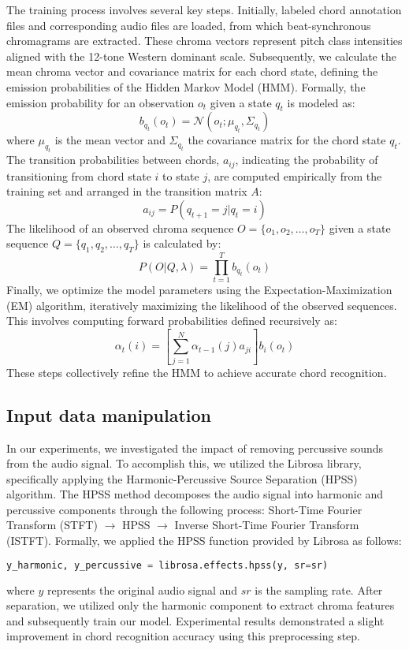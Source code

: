 \documentclass{article}
\begin{document}
The training process involves several key steps. Initially, labeled chord annotation files and corresponding audio files are loaded, from which beat-synchronous chromagrams are extracted. These chroma vectors represent pitch class intensities aligned with the 12-tone Western dominant scale. Subsequently, we calculate the mean chroma vector and covariance matrix for each chord state, defining the emission probabilities of the Hidden Markov Model (HMM). Formally, the emission probability for an observation $o_t$ given a state $q_t$ is modeled as:
\begin{equation}
b_{q_t}(o_t) = \mathcal{N}(o_t;\mu_{q_t}, \Sigma_{q_t})
\end{equation}
where $\mu_{q_t}$ is the mean vector and $\Sigma_{q_t}$ the covariance matrix for the chord state $q_t$. The transition probabilities between chords, $a_{ij}$, indicating the probability of transitioning from chord state $i$ to state $j$, are computed empirically from the training set and arranged in the transition matrix $A$:
\begin{equation}
a_{ij} = P(q_{t+1}=j|q_t=i)
\end{equation}
The likelihood of an observed chroma sequence $O = \{o_1, o_2, \dots, o_T\}$ given a state sequence $Q = \{q_1, q_2, \dots, q_T\}$ is calculated by:
\begin{equation}
P(O|Q,\lambda) = \prod_{t=1}^{T} b_{q_t}(o_t)
\end{equation}
Finally, we optimize the model parameters using the Expectation-Maximization (EM) algorithm, iteratively maximizing the likelihood of the observed sequences. This involves computing forward probabilities defined recursively as:
\begin{equation}
\alpha_t(i) = \left[\sum_{j=1}^{N}\alpha_{t-1}(j)a_{ji}\right] b_i(o_t)
\end{equation}
These steps collectively refine the HMM to achieve accurate chord recognition.

\subsection{Input data manipulation}
In our experiments, we investigated the impact of removing percussive sounds from the audio signal. To accomplish this, we utilized the Librosa library, specifically applying the Harmonic-Percussive Source Separation (HPSS) algorithm. The HPSS method decomposes the audio signal into harmonic and percussive components through the following process: Short-Time Fourier Transform (STFT) $\rightarrow$ HPSS $\rightarrow$ Inverse Short-Time Fourier Transform (ISTFT). Formally, we applied the HPSS function provided by Librosa as follows:
\begin{lstlisting}[language=Python]
y_harmonic, y_percussive = librosa.effects.hpss(y, sr=sr)
\end{lstlisting}
where $y$ represents the original audio signal and $sr$ is the sampling rate. After separation, we utilized only the harmonic component to extract chroma features and subsequently train our model. Experimental results demonstrated a slight improvement in chord recognition accuracy using this preprocessing step.
\end{document}
